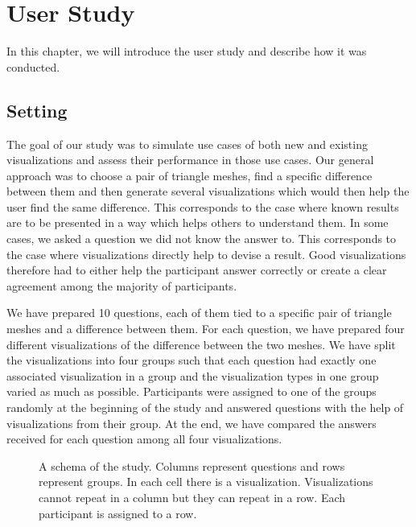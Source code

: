 \chapter{User Study}

In this chapter, we will introduce the user study and describe how it was conducted.

\section{Setting}
\label{sec:user_study-setting}

The goal of our study was to simulate use cases of both new and existing visualizations and assess their performance in those use cases. Our general approach was to choose a pair of triangle meshes, find a specific difference between them and then generate several visualizations which would then help the user find the same difference. This corresponds to the case where known results are to be presented in a way which helps others to understand them. In some cases, we asked a question we did not know the answer to. This corresponds to the case where visualizations directly help to devise a result. Good visualizations therefore had to either help the participant answer correctly or create a clear agreement among the majority of participants.

We have prepared 10 questions, each of them tied to a specific pair of triangle meshes and a difference between them. For each question, we have prepared four different visualizations of the difference between the two meshes. We have split the visualizations into four groups such that each question had exactly one associated visualization in a group and the visualization types in one group varied as much as possible. Participants were assigned to one of the groups randomly at the beginning of the study and answered questions with the help of visualizations from their group. At the end, we have compared the answers received for each question among all four visualizations.

\begin{figure}[h]
	\centering
	\def\svgwidth{\textwidth}
	
	\caption[Study Setting]{A schema of the study. Columns represent questions and rows represent groups. In each cell there is a visualization. Visualizations cannot repeat in a column but they can repeat in a row. Each participant is assigned to a row.}
	\label{fig:study_setting}
\end{figure}

